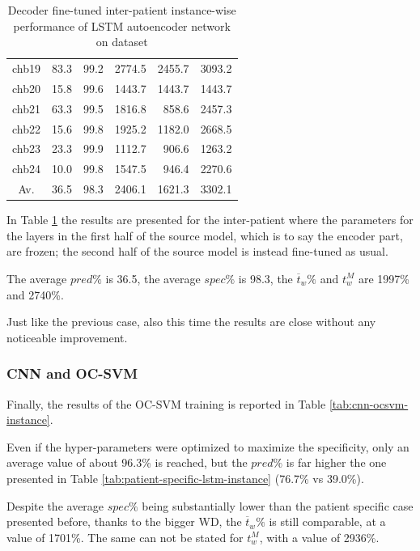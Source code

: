 \begin{table}[ht]
\begin{tabular}{c|rrrrr}
    chb19   & 83.3   & 99.2   & 2774.5  & 2455.7  & 3093.2  \\
    chb20   & 15.8   & 99.6   & 1443.7  & 1443.7  & 1443.7  \\
    chb21   & 63.3   & 99.5   & 1816.8  & 858.6   & 2457.3  \\
    chb22   & 15.6   & 99.8   & 1925.2  & 1182.0  & 2668.5  \\
    chb23   & 23.3   & 99.9   & 1112.7  & 906.6   & 1263.2  \\
    chb24   & 10.0   & 99.8   & 1547.5  & 946.4   & 2270.6  \\ \hline
    Av.     & 36.5   & 98.3   & 2406.1  & 1621.3  & 3302.1  \\ \hline
    \end{tabular}
    \caption{Decoder fine-tuned inter-patient instance-wise performance of LSTM autoencoder network on  dataset}
    \label{tab:decoder-inter-patient-lstm-instance} 
\end{table}

In Table \ref{tab:decoder-inter-patient-lstm-instance} the results are presented for the inter-patient where the parameters for the layers in the first half of the source model, which is to say the encoder part, are frozen; the second half of the source model is instead fine-tuned as usual.

The average $pred\%$ is 36.5, the average $spec\%$ is 98.3, the $\overline{t}_w\%$ and $t_w^M$ are 1997\% and 2740\%.

Just like the previous case, also this time the results are close without any noticeable improvement.


\subsubsection{CNN and OC-SVM}
Finally, the results of the \gls{OC-SVM} training is reported in Table \ref{tab:cnn-ocsvm-instance}.

Even if the hyper-parameters were optimized to maximize the specificity, only an average value of about 96.3\% is reached, but the $pred\%$ is far higher the one presented in Table \ref{tab:patient-specific-lstm-instance} (76.7\% vs 39.0\%).

Despite the average $spec\%$ being substantially lower than the patient specific case presented before, thanks to the bigger \gls{WD}, the $\overline{t}_w\%$ is still comparable, at a value of 1701\%. The same can not be stated for $t_w^M$,  with a value of 2936\%.

